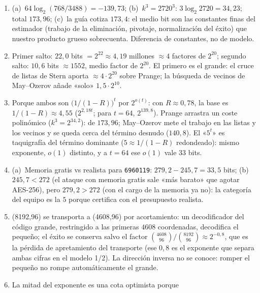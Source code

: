 \begin{enumerate}[leftmargin=1.9em,itemsep=4pt]
  \item (a)~$64\log_2(768/3488)=-139{,}73$;
        (b)~$k^3=2720^3$: $3\log_2 2720=34{,}23$; total
        $173{,}96$; (c)~la guía cotiza $173{,}4$: el medio bit son
        las constantes finas del estimador (trabajo de la
        eliminación, pivotaje, normalización del éxito) que
        nuestro producto grueso sobrecuenta. Diferencia de
        constantes, no de modelo.
  \item Primer salto: $22{,}0$ bits $=2^{22}\approx4{,}19$ millones
        $\approx4$ factores de $2^{20}$; segundo salto: $10{,}6$
        bits $\approx1552$, medio factor de $2^{20}$. El primero es
        el grande: el cruce de listas de Stern aporta
        $\approx4\cdot2^{20}$ sobre Prange; la búsqueda de vecinos
        de May--Ozerov añade «solo» $1{,}5\cdot2^{10}$.
  \item Porque ambos son $\bigl(1/(1-R)\bigr)^{t}$ por
        $2^{o(t)}$: con $R\approx0{,}78$, la base es
        $1/(1-R)\approx4{,}55$ ($2^{2{,}18t}$; para $t=64$,
        $2^{139{,}8}$). Prange arrastra un coste polinómico
        ($k^3=2^{34{,}2}$): de $173{,}96$; May--Ozerov mete el
        trabajo en las listas y los vecinos y se queda cerca del
        término desnudo ($140{,}8$). El «$5^t$» es taquigrafía del
        término dominante ($5\approx1/(1-R)$ redondeado): mismo
        exponente, $o(1)$ distinto, y a $t=64$ ese $o(1)$ vale
        $33$ bits.
  \item (a)~Memoria gratis vs realista para \texttt{6960119}:
        $279{,}2-245{,}7=33{,}5$ bits; (b)~$245{,}7<272$ (el
        ataque con memoria gratis sale «más barato» que agotar
        AES-256), pero $279{,}2>272$ (con el cargo de la memoria
        ya no): la categoría del equipo es la $5$ porque certifica
        con el presupuesto realista.
  \item (8192,96) se transporta a (4608,96) por acortamiento: un
        decodificador del código grande, restringido a las primeras
        $4608$ coordenadas, decodifica el pequeño; el éxito se
        conserva salvo el factor $\binom{4608}{96}/\binom{8192}{96}
        \approx2^{-0{,}8}$, que es la pérdida de apretamiento del
        transporte (ese $0{,}8$ es el exponente que separa ambas
        cifras en el modelo 1/2). La dirección inversa no se
        conoce: romper el pequeño no rompe automáticamente el
        grande.
  \item La mitad del exponente es una cota optimista porque

\end{enumerate}
